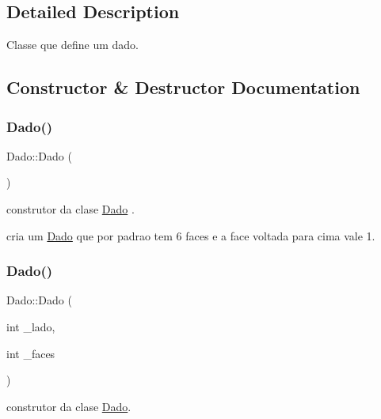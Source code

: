 \subsection{Detailed Description}
Classe que define um dado. 

\subsection{Constructor \& Destructor Documentation}
\mbox{\label{class_dado_a4a541e4bd3b4d8a2bd5d58cfdcf0169a}} 
\subsubsection{\texorpdfstring{Dado()}{Dado()}\hspace{0.1cm}{\footnotesize\ttfamily [1/2]}}
{\footnotesize\ttfamily Dado\+::\+Dado (\begin{DoxyParamCaption}{ }\end{DoxyParamCaption})}



construtor da clase \mbox{\hyperlink{class_dado}{Dado}} . 

cria um \mbox{\hyperlink{class_dado}{Dado}} que por padrao tem 6 faces e a face voltada para cima vale 1. \mbox{\label{class_dado_a3fc20e06674ec7c9ef1645aacfc89896}} 
\subsubsection{\texorpdfstring{Dado()}{Dado()}\hspace{0.1cm}{\footnotesize\ttfamily [2/2]}}
{\footnotesize\ttfamily Dado\+::\+Dado (\begin{DoxyParamCaption}\item[{int}]{\+\_\+lado,  }\item[{int}]{\+\_\+faces }\end{DoxyParamCaption})}



construtor da clase \mbox{\hyperlink{class_dado}{Dado}}. 


